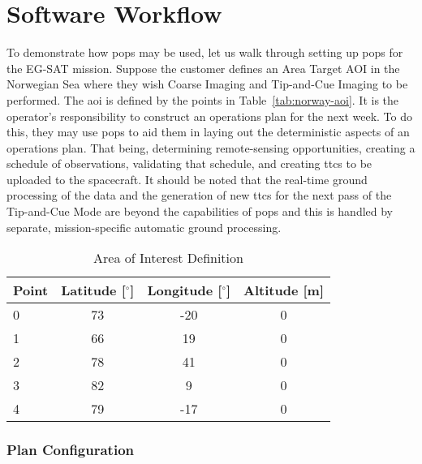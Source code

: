 \glsresetall{} 


\chapter{Software Workflow}\label{chap:workflow}

To demonstrate how \gls{pops} may be used, let us walk through setting up
\gls{pops} for the EG-SAT mission. Suppose the customer defines an Area Target
AOI in the Norwegian Sea where they wish Coarse Imaging and Tip-and-Cue Imaging
to be performed. The \gls{aoi} is defined by the points  in
Table~\ref{tab:norway-aoi}. It is the operator’s responsibility to construct an
operations plan for the next week. To do this, they may use \gls{pops} to aid
them in laying out the deterministic aspects of an operations plan.  That
being, determining remote-sensing opportunities, creating a schedule of
observations, validating that schedule, and creating \glspl{ttc} to be uploaded
to the spacecraft. It should be noted that the real-time ground processing of
the data and the generation of new \glspl{ttc} for the next pass of the
Tip-and-Cue Mode are beyond the capabilities of \gls{pops} and this is handled
by separate, mission-specific automatic ground processing. 

\begin{table}[h] 
    \centering
    \caption{Area of Interest Definition}
    \begin{tabular}{cccc}
	Point                  & Latitude [$^\circ$] & Longitude [$^\circ$] & Altitude [m] \\ \hline
	\multicolumn{1}{l|}{0} & 73       & -20      & 0        \\
	\multicolumn{1}{l|}{1} & 66       & 19       & 0        \\
	\multicolumn{1}{l|}{2} & 78       & 41       & 0        \\
	\multicolumn{1}{l|}{3} & 82       & 9        & 0        \\
	\multicolumn{1}{l|}{4} & 79       & -17      & 0       
    \end{tabular}
    \label{tab:norway}
\end{table}



\subsection{Plan Configuration}

